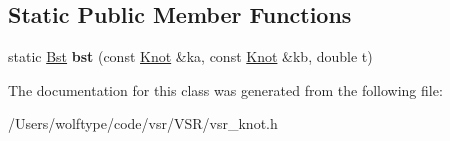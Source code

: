 \subsection*{Static Public Member Functions}
\begin{DoxyCompactItemize}
\item 
\hypertarget{classvsr_1_1_knot_af47111395af3cffcde4896884d959053}{static \hyperlink{namespacevsr_a9f737171e19572794ba7b6c12e8e679f}{Bst} {\bfseries bst} (const \hyperlink{classvsr_1_1_knot}{Knot} \&ka, const \hyperlink{classvsr_1_1_knot}{Knot} \&kb, double t)}\label{classvsr_1_1_knot_af47111395af3cffcde4896884d959053}

\end{DoxyCompactItemize}


The documentation for this class was generated from the following file\-:\begin{DoxyCompactItemize}
\item 
/\-Users/wolftype/code/vsr/\-V\-S\-R/vsr\-\_\-knot.\-h\end{DoxyCompactItemize}
